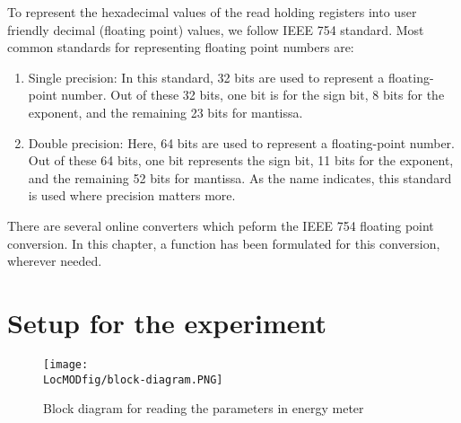 

To represent the hexadecimal values of the read holding
registers into user friendly decimal (floating point) values, we
follow IEEE 754 standard. Most common standards for representing
floating point numbers are:
\begin{enumerate}
  \item Single precision: In this standard, 32 bits are used to represent a floating-point number. Out of these 32 bits, one bit is for the sign bit, 8 bits for the exponent, and the remaining 23 bits for mantissa.
  \item Double precision: Here, 64 bits are used to represent a floating-point number. Out of these 64 bits, one bit represents the sign bit, 11 bits for the exponent, and the remaining 52 bits for mantissa. As the name indicates, this standard is used where precision matters more.
\end{enumerate}
There are several online converters \cite{ieee-754-conv} which peform the
IEEE 754 floating point conversion. In this chapter, a function has been formulated for this conversion, wherever needed.


\section{Setup for the experiment}
\begin{figure}
  \centering
  \texttt{[image: \\LocMODfig/block-diagram.PNG]}
  \caption{Block diagram for reading the parameters in energy meter}
  \label{fig:block-diagram}
\end{figure}

